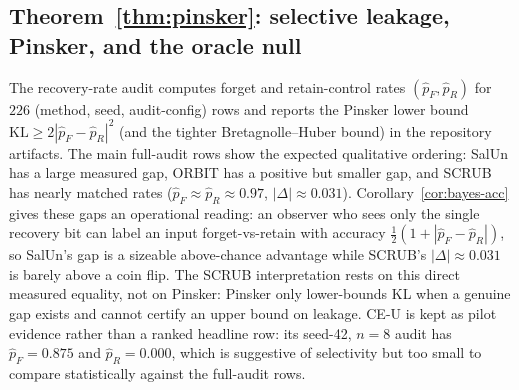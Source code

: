 \documentclass{article}
\begin{document}
\subsection{Theorem~\ref{thm:pinsker}: selective leakage, Pinsker, and the oracle null}
The recovery-rate audit computes forget and retain-control rates $(\hat p_F, \hat p_R)$ for $226$ (method, seed, audit-config) rows and reports the Pinsker lower bound $\mathrm{KL} \geq 2|\hat p_F - \hat p_R|^2$ (and the tighter Bretagnolle--Huber bound) in the repository artifacts. The main full-audit rows show the expected qualitative ordering: SalUn has a large measured gap, ORBIT has a positive but smaller gap, and SCRUB has nearly matched rates ($\hat p_F \approx \hat p_R \approx 0.97$, $|\Delta| \approx 0.031$). Corollary~\ref{cor:bayes-acc} gives these gaps an operational reading: an observer who sees only the single recovery bit can label an input forget-vs-retain with accuracy $\tfrac{1}{2}(1+|\hat p_F-\hat p_R|)$, so SalUn's gap is a sizeable above-chance advantage while SCRUB's $|\Delta|\approx0.031$ is barely above a coin flip. The SCRUB interpretation rests on this direct measured equality, not on Pinsker: Pinsker only lower-bounds KL when a genuine gap exists and cannot certify an upper bound on leakage. CE-U is kept as pilot evidence rather than a ranked headline row: its seed-42, $n=8$ audit has $\hat p_F = 0.875$ and $\hat p_R = 0.000$, which is suggestive of selectivity but too small to compare statistically against the full-audit rows.
\end{document}
